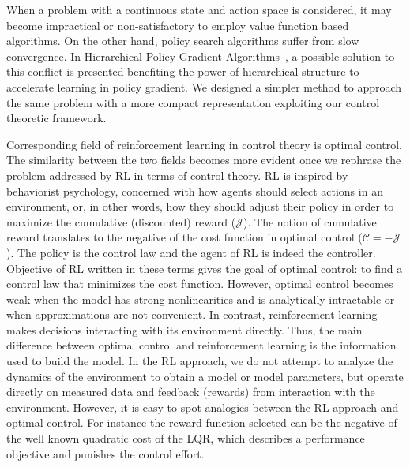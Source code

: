 When a problem with a continuous state and action space is considered, it may become impractical or non-satisfactory to employ value function based algorithms. On the other hand, policy search algorithms suffer from slow convergence.  In Hierarchical Policy Gradient Algorithms~\cite{GhavamzadehHierarchicalPG}, a possible solution to this conflict is presented benefiting the power of hierarchical structure to accelerate learning in policy gradient. 
We designed a simpler method to approach the same problem with a more compact representation exploiting our control theoretic framework.  

Corresponding field of reinforcement learning in control theory is optimal control. The similarity between the two fields becomes more evident once we rephrase the problem addressed by RL in terms of control theory. RL is inspired by behaviorist psychology, concerned with how agents should select actions in an environment, or, in other words, how they should adjust their policy in order to maximize the cumulative (discounted) reward ($\mathcal{J}$). The notion of cumulative reward translates to the negative of the cost function in optimal control ($\mathcal{C}=-\mathcal{J}$). The policy is the control law and the agent of RL is indeed the controller. Objective of RL written in these terms gives the goal of optimal control: to find a control law that minimizes the cost function. However, optimal control becomes weak when the model has strong nonlinearities and is analytically intractable or when approximations are not convenient. In contrast, reinforcement learning makes decisions interacting with its environment directly. Thus, the main difference between optimal control and reinforcement learning is the information used to build the model. In the RL approach, we do not attempt to analyze the dynamics of the environment to obtain a model or model parameters, but operate directly on measured data and feedback (rewards) from interaction with the environment. However, it is easy to spot analogies between the RL approach and optimal control. For instance the reward function selected can be the negative of the well known quadratic cost of the LQR, which describes a performance objective and punishes the control effort.

